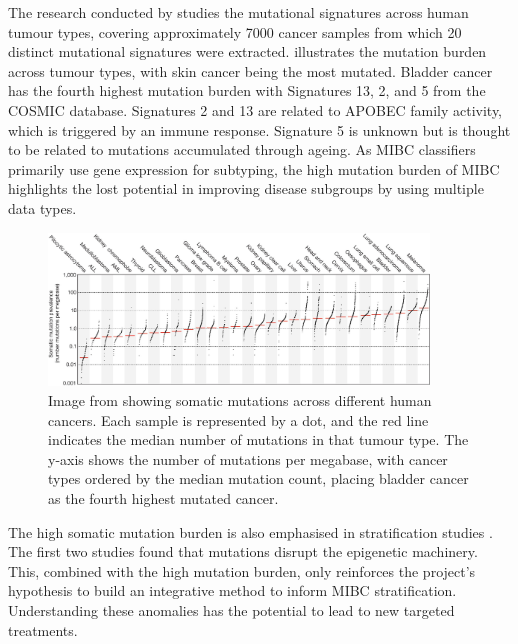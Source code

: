 The research conducted by \citet{Alexandrov2013-gi} studies the mutational signatures across human tumour types, covering approximately 7000 cancer samples from which 20 distinct mutational signatures were extracted.  illustrates the mutation burden across tumour types, with skin cancer being the most mutated. Bladder cancer has the fourth highest mutation burden with Signatures 13, 2, and 5 from the COSMIC database\cite{Tate2019-yj}. Signatures 2 and 13 are related to APOBEC family activity, which is triggered by an immune response. Signature 5 is unknown but is thought to be related to mutations accumulated through ageing. As MIBC classifiers primarily use gene expression for subtyping, the high mutation burden of MIBC highlights the lost potential in improving disease subgroups by using multiple data types.

\begin{figure}[!htb]    
    \centering
\includegraphics[width=0.9\textwidth,height=0.9\textheight,keepaspectratio]{Sections/Lit_review/Resources/mut_sig_cancers.jpg}
    \caption{Image from \cite{Alexandrov2013-gi} showing somatic mutations across different human cancers. Each sample is represented by a dot, and the red line indicates the median number of mutations in that tumour type. The y-axis shows the number of mutations per megabase, with cancer types ordered by the median mutation count, placing bladder cancer as the fourth highest mutated cancer.}
    \label{fig:lit:cancer_mut_sig}
\end{figure}

The high somatic mutation burden is also emphasised in stratification studies \cite{Tcga2014-dr, Robertson2017-mg, Kamoun2020-tj}. The first two studies found that mutations disrupt the epigenetic machinery. This, combined with the high mutation burden, only reinforces the project's hypothesis to build an integrative method to inform MIBC stratification. Understanding these anomalies has the potential to lead to new targeted treatments.

